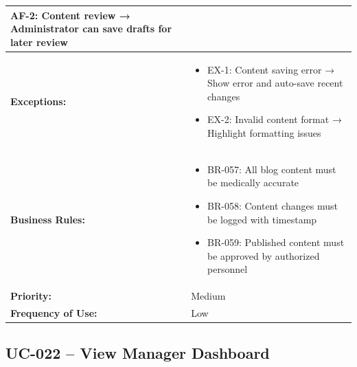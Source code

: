 \documentclass[12pt,a4paper]{article}
\begin{document}
\begin{longtable}{|p{4.5cm}|p{10.5cm}|}
\textbf{AF-2:} Content review → Administrator can save drafts for later review \\
\hline
\textbf{Exceptions:} &
\begin{itemize}
  \item EX-1: Content saving error → Show error and auto-save recent changes
  \item EX-2: Invalid content format → Highlight formatting issues
\end{itemize} \\
\hline
\textbf{Business Rules:} &
\begin{itemize}
  \item BR-057: All blog content must be medically accurate
  \item BR-058: Content changes must be logged with timestamp
  \item BR-059: Published content must be approved by authorized personnel
\end{itemize} \\
\hline
\textbf{Priority:} & Medium \\
\hline
\textbf{Frequency of Use:} & Low \\
\hline
\end{longtable}

\subsection{UC-022 – View Manager Dashboard}
\end{document}
